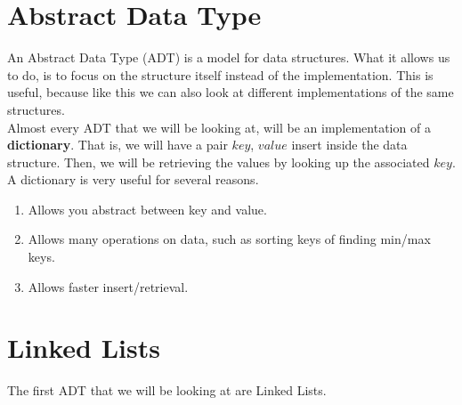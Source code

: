 \documentclass[../notebook.tex]{subfiles}
\begin{document}
\begin{center}

\end{center}

\section{Abstract Data Type} %
\label{sec:Abstact Data Type}
An Abstract Data Type (ADT) is a model for data structures. What it allows us to do, is to focus on the structure itself instead of the implementation. This is useful, because like this we can also look at different implementations of the same structures. \\
Almost every ADT that we will be looking at, will be an implementation of a {\bf dictionary}. That is, we will have a pair $key$, $value$ insert inside the data structure. Then, we will be retrieving the values by looking up the associated $key$. A dictionary is very useful for several reasons. 
\begin{enumerate}
  \item Allows you abstract between key and value.
  \item Allows many operations on data, such as sorting keys of finding min/max keys.
  \item Allows faster insert/retrieval.
\end{enumerate}
\section{ Linked Lists } %
\label{sec:Stacks and queues}
The first ADT that we will be looking at are Linked Lists. 
\end{document}
